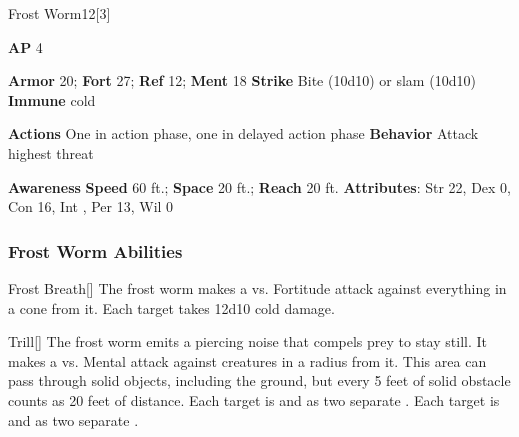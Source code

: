 \begin{monsection}{Frost Worm}{12}[3]
\vspace{-1em}\vspace{-1em}
\begin{spellcontent}
\begin{spelltargetinginfo}
{\textbf{AP} 4}

\pari \textbf{Armor} 20;
\textbf{Fort} 27;
\textbf{Ref} 12;
\textbf{Ment} 18
\pari \textbf{Strike} Bite  (10d10) or slam  (10d10)
\pari \textbf{Immune} cold

\pari \textbf{Actions} One in action phase, one in delayed action phase
\pari \textbf{Behavior} Attack highest threat
\end{spelltargetinginfo}
\end{spellcontent}

\begin{monsterfooter}
\pari \textbf{Awareness} 
\pari \textbf{Speed} 60 ft.;
\textbf{Space} 20 ft.;
\textbf{Reach} 20 ft.
\pari \textbf{Attributes}:
Str 22,
Dex 0,
Con 16,
Int ,
Per 13,
Wil 0
\end{monsterfooter}
\end{monsection}


\subsubsection{Frost Worm Abilities}

\begin{freeability}{Frost Breath}[]
The frost worm makes a  vs. Fortitude attack against everything in a \arealarge cone from it.
\hit Each target takes 12d10 cold damage.
\end{freeability}

\vspace{0.5em}
\begin{apability}{Trill}[]
The frost worm emits a piercing noise that compels prey to stay still.
It makes a  vs. Mental attack against creatures in a \areahuge radius from it.
This area can pass through solid objects, including the ground, but every 5 feet of solid obstacle counts as 20 feet of distance.
\hit Each target is  and  as two separate .
\crit Each target is  and  as two separate .
\end{apability}

